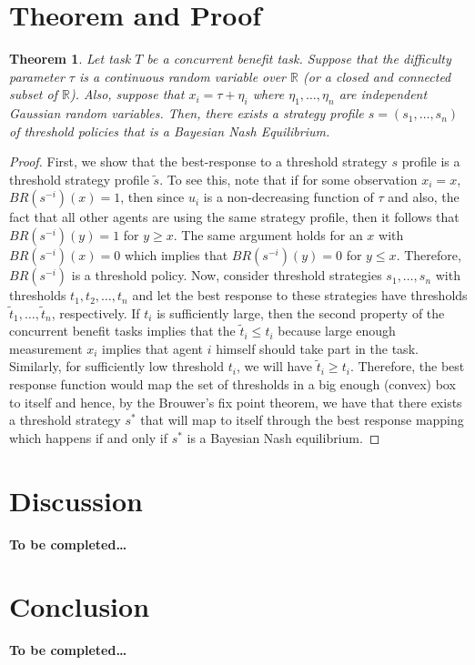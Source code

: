 \documentclass[conference]{ieeeconf}
\newtheorem{theorem}{Theorem}
\def\R{\mathbb{R}}
\begin{document}
\section{Theorem and Proof}\label{sec:thmproof}
\begin{theorem}
Let task $T$ be a concurrent benefit task. Suppose that the difficulty parameter $\tau$ is a continuous random variable over $\R$ (or a closed and connected subset of $\R$). Also, suppose that $x_i=\tau+\eta_i$ where $\eta_1,\ldots,\eta_n$ are independent Gaussian random variables. Then, there exists a strategy profile $s=(s_1,\ldots,s_n)$ of threshold policies that is a Bayesian Nash Equilibrium.
\end{theorem}
\begin{proof}
First, we show that the best-response to a threshold strategy $s$ profile is a threshold strategy profile $\tilde{s}$. To see this, note that if for some observation $x_i=x$, $BR(s^{-i})(x)=1$, then since $u_i$ is a non-decreasing function of $\tau$ and also, the fact that all other agents are using the same strategy profile, then it follows that $BR(s^{-i})(y)=1$ for $y\geq x$. The same argument holds for an $x$ with $BR(s^{-i})(x)=0$ which implies that $BR(s^{-i})(y)=0$ for $y\leq x$. Therefore, $BR(s^{-i})$  is a threshold policy. Now, consider threshold strategies $s_1,\ldots,s_n$ with thresholds $t_1,t_2,\ldots,t_n$ and let the best response to these strategies have thresholds $\tilde{t}_1,\ldots,\tilde{t}_n$, respectively. If $t_i$ is sufficiently large, then the second property of the concurrent benefit tasks implies that the $\tilde{t}_i\leq t_i$ because large enough measurement $x_i$ implies that agent $i$ himself should take part in the task. Similarly, for sufficiently low threshold $t_i$, we will have $\tilde{t}_i\geq t_i$. Therefore, the best response function would map the set of thresholds in a big enough (convex) box to itself and hence, by the Brouwer's fix point theorem, we have that there exists a threshold strategy $s^*$ that will map to itself through the best response mapping which happens if and only if $s^*$ is a Bayesian Nash equilibrium. 
\end{proof}



\section{Discussion}\label{sec:disc}
\textbf{To be completed\ldots}



\section{Conclusion}\label{sec:conc}
\textbf{To be completed\ldots}



\nocite{*}

\end{document}
